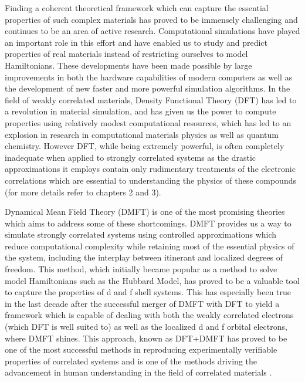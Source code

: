 \documentclass[10pt]{ruthesis}
\begin{document}

Finding a coherent theoretical framework which can capture the essential properties of such complex materials has proved to be immensely challenging and continues to be an area of active research. Computational simulations have played an important role in this effort and have enabled us to study and predict properties of real materials instead of restricting ourselves to model Hamiltonians. These developments have been made possible by large improvements in both the hardware capabilities of modern computers as well as the development of new faster and more powerful simulation algorithms. In the field of weakly correlated materials, Density Functional Theory (DFT) has led to a revolution in material simulation, and has given us the power to compute properties using relatively modest computational resources, which has led to an explosion in research in computational materials physics as well as quantum chemistry. However DFT, while being extremely powerful, is often completely inadequate when applied to strongly correlated systems as the drastic approximations it employs  contain only rudimentary treatments of the electronic correlations which are essential to understanding the physics of these compounds (for more details refer to chapters 2 and 3).

Dynamical Mean Field Theory (DMFT) is one of the most promising theories which aims to address some of these shortcomings. DMFT provides us a way to simulate strongly correlated systems using controlled approximations which reduce computational complexity while retaining most of the essential physics of the system, including the interplay between itinerant and localized degrees of freedom. This method, which initially became popular as a method to solve model Hamiltonians such as the Hubbard Model, has proved to be a valuable tool to capture the properties of d and f shell systems. This has especially been true in the last decade after the successful merger of DMFT with DFT to yield a framework which is capable of dealing with both the weakly correlated electrons (which DFT is well suited to) as well as the localized d and f orbital electrons, where DMFT shines. This approach, known as DFT+DMFT has proved to be one of the most successful methods in reproducing experimentally verifiable properties of correlated systems and is one of the methods driving the advancement in human understanding in the field of correlated materials .
\end{document}
